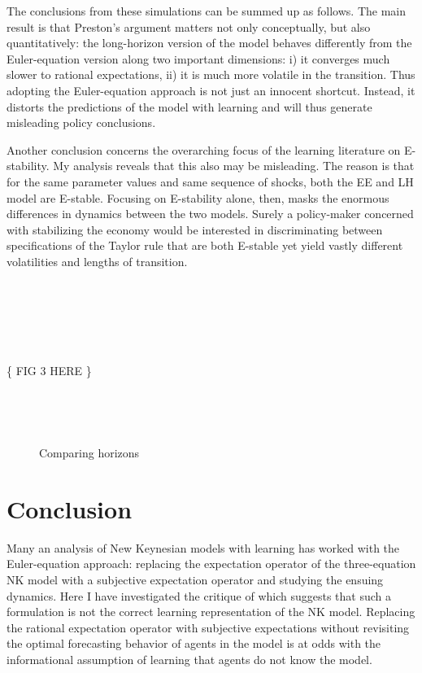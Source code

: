 \documentclass[11pt]{article}
\def \myFigPath {../../figures/}
\renewcommand{\[}{\begin{equation}}
\renewcommand{\]}{\end{equation}}
\def\myBiggerFigScale{0.4}
\begin{document}
The conclusions from these simulations can be summed up as follows. The main result is that Preston's argument matters not only conceptually, but also quantitatively: the long-horizon version of the model behaves differently from the Euler-equation version along two important dimensions: i) it converges much slower to rational expectations, ii) it is much more volatile in the transition. Thus adopting the Euler-equation approach is not just an innocent shortcut. Instead, it distorts the predictions of the model with learning and will thus generate misleading policy conclusions.

Another conclusion concerns the overarching focus of the learning literature on E-stability. My analysis reveals that this also may be misleading. The reason is that for the same parameter values and same sequence of shocks, both the EE and LH model are E-stable. Focusing on E-stability alone, then, masks the enormous differences in dynamics between the two models. Surely a policy-maker concerned with stabilizing the economy would be interested in discriminating between specifications of the Taylor rule that are both E-stable yet yield vastly different volatilities and lengths of transition. 

\

\

\

\hspace{5cm} \{ FIG 3 HERE \}

\

\



\begin{figure}[h!]
\caption{Comparing horizons}
\label{horizons}
\end{figure}

\clearpage
\section{Conclusion}\label{conclusion}
Many an analysis of New Keynesian models with learning has worked with the Euler-equation approach: replacing the expectation operator of the three-equation NK model with a subjective expectation operator and studying the ensuing dynamics. Here I have investigated the critique of \cite{preston2005} which suggests that such a formulation is not the correct learning representation of the NK model. Replacing the rational expectation operator with subjective expectations without revisiting the optimal forecasting behavior of agents in the model is at odds with the informational assumption of learning that agents do not know the model. 
\end{document}
